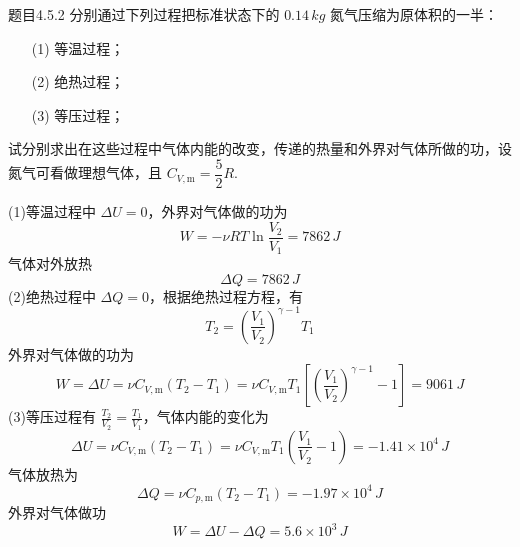 \begin{question}{题目4.5.2}
    分别通过下列过程把标准状态下的 $0.14 \,\si{kg}$ 氮气压缩为原体积的一半：
    \begin{enumerate}
        \item[(1)] 等温过程；
        \item[(2)] 绝热过程；
        \item[(3)] 等压过程；
    \end{enumerate}
    试分别求出在这些过程中气体内能的改变，传递的热量和外界对气体所做的功，设氮气可看做理想气体，且 $C_{V,\mathrm{m}} = \dfrac{5}{2}R$.
\end{question}
\begin{solution}
    (1)等温过程中 $\Delta{U} = 0$，外界对气体做的功为
    $$
        W = - \nu RT \ln \frac{V_2}{V_1} = 7862 \,\si{J}
    $$
    气体对外放热
    $$
        \Delta{Q} = 7862 \,\si{J}
    $$
    (2)绝热过程中 $\Delta{Q} = 0$，根据绝热过程方程，有
    $$
        T_2 = \left(\frac{V_1}{V_2}\right)^{\gamma - 1} T_1
    $$
    外界对气体做的功为
    $$
        W  = \Delta{U} = \nu C_{V,\mathrm{m}} (T_2 - T_1)
        = \nu C_{V,\mathrm{m}}T_1\left[ \left(\frac{V_1}{V_2}\right)^{\gamma - 1} -1 \right]
        = 9061 \,\si{J}
    $$
    (3)等压过程有 $\frac{T_2}{V_2} = \frac{T_1}{V_1}$，气体内能的变化为
    $$
        \Delta{U}
        = \nu C_{V,\mathrm{m}} (T_2 - T_1)
        = \nu C_{V,\mathrm{m}} T_1 \left( \frac{V_1}{V_2} - 1 \right)
        = -1.41 \times 10^4 \,\si{J}
    $$
    气体放热为
    $$
        \Delta{Q} = \nu C_{p,\mathrm{m}} (T_2 - T_1) = -1.97 \times 10^4 \,\si{J}
    $$
    外界对气体做功
    $$
        W = \Delta{U} - \Delta{Q} = 5.6 \times 10^3 \,\si{J}
    $$
\end{solution}

